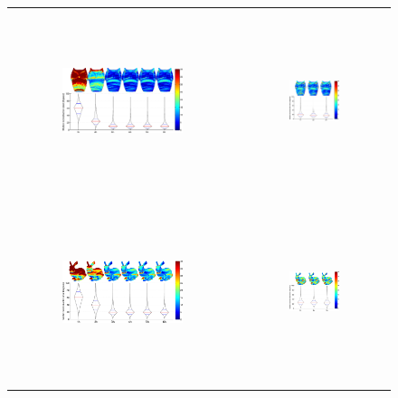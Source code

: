 \begin{figure}
\centering
\footnotesize
\begin{tabular}{cc}
\hspace{0.1cm}\includegraphics[height=5.32cm,width=0.55\textwidth]{recons/owl-left.pdf} & 
\includegraphics[height=5.32cm,width=0.35\textwidth]{recons/owl-right.pdf} \\
\includegraphics[height=5.32cm,width=0.55\textwidth]{recons/bunny-left.pdf} & 
\includegraphics[height=5.32cm,width=0.35\textwidth]{recons/bunny-right.pdf} \\

\end{tabular}
\end{figure}
